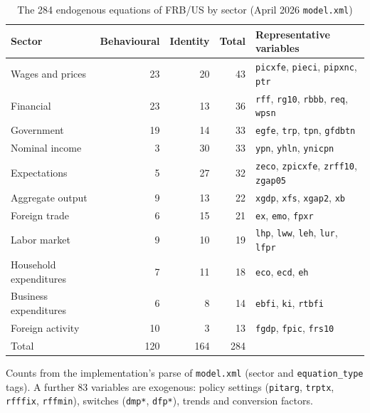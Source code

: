\begin{table}[htbp]
\centering
\caption{The 284 endogenous equations of FRB/US by sector (April 2026 \texttt{model.xml})}
\label{tab:sectors}
\small
\begin{tabular}{lrrrl}
\toprule
Sector & Behavioural & Identity & Total & Representative variables \\
\midrule
Wages and prices           & 23 & 20 & 43 & \texttt{picxfe}, \texttt{pieci}, \texttt{pipxnc}, \texttt{ptr} \\
Financial                  & 23 & 13 & 36 & \texttt{rff}, \texttt{rg10}, \texttt{rbbb}, \texttt{req}, \texttt{wpsn} \\
Government                 & 19 & 14 & 33 & \texttt{egfe}, \texttt{trp}, \texttt{tpn}, \texttt{gfdbtn} \\
Nominal income             &  3 & 30 & 33 & \texttt{ypn}, \texttt{yhln}, \texttt{ynicpn} \\
Expectations               &  5 & 27 & 32 & \texttt{zeco}, \texttt{zpicxfe}, \texttt{zrff10}, \texttt{zgap05} \\
Aggregate output           &  9 & 13 & 22 & \texttt{xgdp}, \texttt{xfs}, \texttt{xgap2}, \texttt{xb} \\
Foreign trade              &  6 & 15 & 21 & \texttt{ex}, \texttt{emo}, \texttt{fpxr} \\
Labor market               &  9 & 10 & 19 & \texttt{lhp}, \texttt{lww}, \texttt{leh}, \texttt{lur}, \texttt{lfpr} \\
Household expenditures     &  7 & 11 & 18 & \texttt{eco}, \texttt{ecd}, \texttt{eh} \\
Business expenditures      &  6 &  8 & 14 & \texttt{ebfi}, \texttt{ki}, \texttt{rtbfi} \\
Foreign activity           & 10 &  3 & 13 & \texttt{fgdp}, \texttt{fpic}, \texttt{frs10} \\
\midrule
Total                      & 120 & 164 & 284 & \\
\bottomrule
\end{tabular}

\medskip
\parbox{0.95\textwidth}{\footnotesize Counts from the implementation's parse of \texttt{model.xml} (sector and \texttt{equation\_type} tags). A further 83 variables are exogenous: policy settings (\texttt{pitarg}, \texttt{trptx}, \texttt{rfffix}, \texttt{rffmin}), switches (\texttt{dmp*}, \texttt{dfp*}), trends and conversion factors.}
\end{table}


